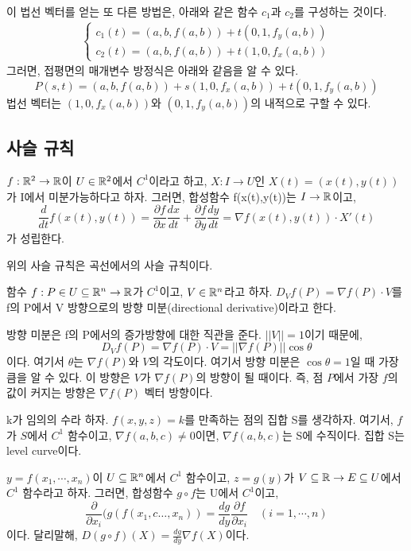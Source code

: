 이 법선 벡터를 얻는 또 다른 방법은, 아래와 같은 함수 $c_1$과 $c_2$를 구성하는 것이다.
\begin{align*}
\begin{cases}
c_1(t)=(a,b,f(a,b))+t(0,1,f_y(a,b))\\
c_2(t)=(a,b,f(a,b))+t(1,0,f_x(a,b))        
\end{cases}
\end{align*}
그러면, 접평면의 매개변수 방정식은 아래와 같음을 알 수 있다.
$$
P(s,t)=(a,b,f(a,b))+s(1,0,f_x(a,b))+t(0,1,f_y(a,b))
$$
법선 벡터는 $(1,0,f_x(a,b))$와 $(0,1,f_y(a,b))$의 내적으로 구할 수 있다.

\subsection{사슬 규칙}
\begin{theorem}
$f: \mathbb{R}^2 \to \mathbb{R}$이 $U \in \mathbb{R}^2$에서 $C^1$이라고 하고, $X: I \to U$인 $X(t)=(x(t),y(t))$가 I에서 미분가능하다고 하자. 그러면, 합성함수 f(x(t),y(t))는 $I \to \mathbb{R}$이고,
$$
\frac{d}{dt}f(x(t),y(t))=\frac{\partial f}{\partial x} \frac{dx}{dt} + \frac{\partial f}{\partial y} \frac{dy}{dt} = \nabla f(x(t),y(t)) \cdot X'(t)
$$
가 성립한다.
\end{theorem}

위의 사슬 규칙은 곡선에서의 사슬 규칙이다.

\begin{definition}[방향 미분]
함수 $f: P \in U \subseteq \mathbb{R}^n \to \mathbb{R}$가 $C^1$이고, $V \in \mathbb{R}^n$라고 하자. $D_V f(P) = \nabla f(P) \cdot V$를 f의 P에서 V 방향으로의 방향 미분(directional derivative)이라고 한다.
\end{definition}

방향 미분은 f의 P에서의 증가방향에 대한 직관을 준다. $||V||=1$이기 때문에,
$$
D_Vf(P)=\nabla f(P) \cdot V = || \nabla f(P) || \cos \theta
$$
이다. 여기서 $\theta$는 $\nabla f(P)$와 $V$의 각도이다. 여기서 방향 미분은 $\cos \theta = 1$일 때 가장 큼을 알 수 있다. 이 방향은 $V$가 $\nabla f(P)$의 방향이 될 때이다. 즉, 점 $P$에서 가장 $f$의 값이 커지는 방향은 $\nabla f(P)$ 벡터 방향이다.

k가 임의의 수라 하자. $f(x,y,z)=k$를 만족하는 점의 집합 S를 생각하자. 여기서, $f$가 $S$에서 $C^1$ 함수이고, $\nabla f(a,b,c) \neq 0$이면, $\nabla f(a,b,c)$는 S에 수직이다. 집합 S는 level curve이다.

\begin{theorem}
$y=f(x_1,\cdots,x_n)$이 $U \subseteq \mathbb{R}^n$에서 $C^1$ 함수이고, $z=g(y)$가 $V \subseteq \mathbb{R} \to E \subseteq U$에서 $C^1$ 함수라고 하자. 그러면, 합성함수 $g \circ f$는 U에서 $C^1$이고,
$$
\frac{\partial}{\partial x_i}(g(f(x_1,c\dots,x_n))=\frac{dg}{dy}\frac{\partial f}{\partial x_i}\quad (i=1,\cdots,n)
$$
이다. 달리말해, $D(g \circ f)(X)=\frac{dg}{dy}\nabla f(X)$이다.
\end{theorem}

